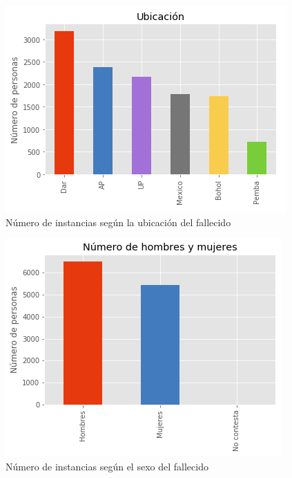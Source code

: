 \documentclass[10pt,a4paper]{article}
\begin{document}
\begin{itemize}
		\begin{figure}
			\includegraphics[width=\linewidth]{figures/plot_ubicacion.png}
			\caption{Número de instancias según la ubicación del fallecido}
			\label{fig:loc_graph}
		\end{figure}

		\begin{figure}
			\includegraphics[width=\linewidth]{figures/plot_sexo.png}
			\caption{Número de instancias según el sexo del fallecido}
			\label{fig:sex_graph}
		\end{figure}


\end{itemize}
\end{document}
